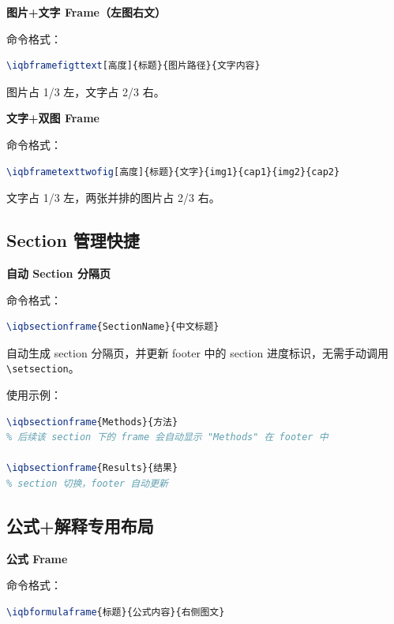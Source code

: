 \textbf{图片+文字 Frame（左图右文）}

命令格式：

\begin{lstlisting}[style=blockstyle,language=TeX]
\iqbframefigttext[高度]{标题}{图片路径}{文字内容}
\end{lstlisting}

图片占 1/3 左，文字占 2/3 右。

\textbf{文字+双图 Frame}

命令格式：

\begin{lstlisting}[style=blockstyle,language=TeX]
\iqbframetexttwofig[高度]{标题}{文字}{img1}{cap1}{img2}{cap2}
\end{lstlisting}

文字占 1/3 左，两张并排的图片占 2/3 右。

\subsection{Section 管理快捷}

\textbf{自动 Section 分隔页}

命令格式：

\begin{lstlisting}[style=blockstyle,language=TeX]
\iqbsectionframe{SectionName}{中文标题}
\end{lstlisting}

自动生成 section 分隔页，并更新 footer 中的 section 进度标识，无需手动调用 \lstinline|\setsection|。

使用示例：

\begin{lstlisting}[style=blockstyle,language=TeX]
\iqbsectionframe{Methods}{方法}
% 后续该 section 下的 frame 会自动显示 "Methods" 在 footer 中

\iqbsectionframe{Results}{结果}
% section 切换，footer 自动更新
\end{lstlisting}

\subsection{公式+解释专用布局}

\textbf{公式 Frame}

命令格式：

\begin{lstlisting}[style=blockstyle,language=TeX]
\iqbformulaframe{标题}{公式内容}{右侧图文}
\end{lstlisting}

